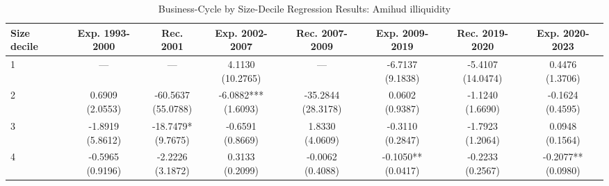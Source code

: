 \begin{table}[!htbp]\centering
\caption{Business-Cycle by Size-Decile Regression Results: Amihud illiquidity}
\label{tab:cycle_size_detailed_amihud_illiq}
\begin{threeparttable}
\footnotesize
\setlength{\tabcolsep}{3.2pt}
\renewcommand{\arraystretch}{1.04}
\begin{tabular}{@{}lccccccc@{}}
\toprule
Size decile & Exp. 1993-2000 & Rec. 2001 & Exp. 2002-2007 & Rec. 2007-2009 & Exp. 2009-2019 & Rec. 2019-2020 & Exp. 2020-2023 \\
\midrule
1 & — & — & \shortstack{4.1130\\(10.2765)} & — & \shortstack{-6.7137\\(9.1838)} & \shortstack{-5.4107\\(14.0474)} & \shortstack{0.4476\\(1.3706)} \\
2 & \shortstack{0.6909\\(2.0553)} & \shortstack{-60.5637\\(55.0788)} & \shortstack{-6.0882***\\(1.6093)} & \shortstack{-35.2844\\(28.3178)} & \shortstack{0.0602\\(0.9387)} & \shortstack{-1.1240\\(1.6690)} & \shortstack{-0.1624\\(0.4595)} \\
3 & \shortstack{-1.8919\\(5.8612)} & \shortstack{-18.7479*\\(9.7675)} & \shortstack{-0.6591\\(0.8669)} & \shortstack{1.8330\\(4.0609)} & \shortstack{-0.3110\\(0.2847)} & \shortstack{-1.7923\\(1.2064)} & \shortstack{0.0948\\(0.1564)} \\
4 & \shortstack{-0.5965\\(0.9196)} & \shortstack{-2.2226\\(3.1872)} & \shortstack{0.3133\\(0.2099)} & \shortstack{-0.0062\\(0.4088)} & \shortstack{-0.1050**\\(0.0417)} & \shortstack{-0.2233\\(0.2567)} & \shortstack{-0.2077**\\(0.0980)} \\

\end{tabular}
\end{threeparttable}
\end{table}
